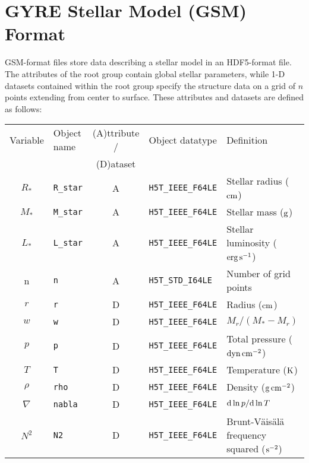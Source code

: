 \documentclass{article}
\newcommand{\diff}{\ensuremath{{\rm d}}}
\newcommand{\Rstar}{\ensuremath{R_{\ast}}}
\newcommand{\Mstar}{\ensuremath{M_{\ast}}}
\newcommand{\Lstar}{\ensuremath{L_{\ast}}}
\newcommand{\cm}{\ensuremath{{\rm cm}}}
\newcommand{\gram}{\ensuremath{{\rm g}}}
\newcommand{\second}{\ensuremath{{\rm s}}}
\newcommand{\dyne}{\ensuremath{{\rm dyn}}}
\newcommand{\erg}{\ensuremath{{\rm erg}}}
\newcommand{\kelvin}{\ensuremath{{\rm K}}}
\begin{document}
\section*{GYRE Stellar Model (GSM) Format}

GSM-format files store data describing a stellar model in an
HDF5-format file. The attributes of the root group contain global
stellar parameters, while 1-D datasets contained within the root group
specify the structure data on a grid of $n$ points extending from
center to surface. These attributes and datasets are defined as
follows:

\begin{table}[h!]
\begin{tabular}{|c|l|c|l|l|} \hline
Variable & Object name & (A)ttribute / & Object datatype & Definition \\
         &             & (D)ataset     &                 &            \\ \hline
\Rstar            & \texttt{R\_star}      & A & \texttt{H5T\_IEEE\_F64LE} & Stellar radius ($\cm$) \\
\Mstar            & \texttt{M\_star}      & A & \texttt{H5T\_IEEE\_F64LE} & Stellar mass ($\gram$) \\
\Lstar            & \texttt{L\_star}      & A & \texttt{H5T\_IEEE\_F64LE} & Stellar luminosity ($\erg\,\second^{-1}$) \\
n                 & \texttt{n}            & A &\texttt{H5T\_STD\_I64LE}  & Number of grid points \\ 
$r$               & \texttt{r}            & D & \texttt{H5T\_IEEE\_F64LE} & Radius ($\cm$) \\
$w$               & \texttt{w}            & D & \texttt{H5T\_IEEE\_F64LE} & $M_{r}/(\Mstar-M_{r})$ \\
$p$               & \texttt{p}            & D & \texttt{H5T\_IEEE\_F64LE} & Total pressure ($\dyne\,\cm^{-2}$) \\
$T$               & \texttt{T}            & D & \texttt{H5T\_IEEE\_F64LE} & Temperature ($\kelvin$) \\
$\rho$            & \texttt{rho}          & D & \texttt{H5T\_IEEE\_F64LE} & Density ($\gram\,\cm^{-2}$) \\
$\nabla$          & \texttt{nabla}        & D & \texttt{H5T\_IEEE\_F64LE} & $\diff \ln p/\diff \ln T$ \\
$N^{2}$           & \texttt{N2}           & D & \texttt{H5T\_IEEE\_F64LE} & Brunt-V\"ais\"al\"a frequency squared ($\second^{-2}$) \\

\end{tabular}
\end{table}
\end{document}
